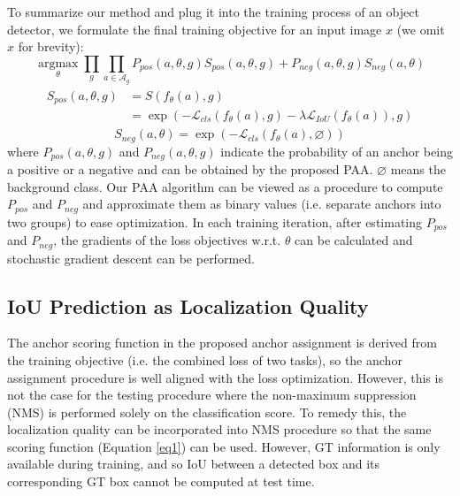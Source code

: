 \documentclass[runningheads]{llncs}
\begin{document}
To summarize our method and plug it into the training process of an object detector, we formulate the final training objective for an input image $x$ (we omit $x$ for brevity):
\begin{equation}
  \operatorname*{argmax}_{\theta} \prod_g\prod_{a \in \mathcal{A}_g} P_{pos}(a, \theta, g)S_{pos}(a, \theta, g) + P_{neg}(a, \theta, g)S_{neg}(a, \theta)
\label{eq:objective}
\end{equation}
\begin{align}
\begin{split}
  S_{pos}(a, \theta, g) &= S(f_{\theta}(a), g) \\
  &= \operatorname{exp}(-\mathcal{L}_{cls}(f_{\theta}(a), g) - \lambda\mathcal{L}_{IoU}(f_{\theta}(a)), g)
\end{split}
\end{align}
\begin{equation}
  S_{neg}(a, \theta) = \operatorname{exp}(-\mathcal{L}_{cls}(f_{\theta}(a), \varnothing))
\end{equation}
where $P_{pos}(a, \theta, g)$ and $P_{neg}(a, \theta, g)$ indicate the probability of an anchor being a positive or a negative and can be obtained by the proposed PAA. $\varnothing$ means the background class. Our PAA algorithm can be viewed as a procedure to compute $P_{pos}$ and $P_{neg}$ and approximate them as binary values (i.e. separate anchors into two groups) to ease optimization. In each training iteration, after estimating $P_{pos}$ and $P_{neg}$, the gradients of the loss objectives w.r.t. $\theta$ can be calculated and stochastic gradient descent can be performed.

\subsection{IoU Prediction as Localization Quality}
The anchor scoring function in the proposed anchor assignment is derived from the training objective (i.e. the combined loss of two tasks), so the anchor assignment procedure is well aligned with the loss optimization. However, this is not the case for the testing procedure where the non-maximum suppression (NMS) is performed solely on the classification score. To remedy this, the localization quality can be incorporated into NMS procedure so that the same scoring function (Equation \ref{eq1}) can be used. However, GT information is only available during training, and so IoU between a detected box and its corresponding GT box cannot be computed at test time.
\end{document}
